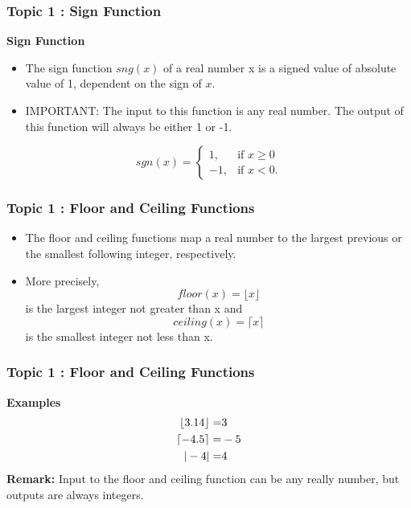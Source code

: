 \documentclass{beamer}
\begin{document}
\begin{frame}
	\frametitle{Topic 1 : Sign Function}
	\Large
	\textbf{Sign Function}
	\begin{itemize}
		\item The sign function $sng(x)$ of a real number x is a signed value of absolute value of 1, dependent on the sign of $x$. 
		
	\item IMPORTANT:  The input to this function is any real number. The output of this function will always be either 1 or -1.
	\end{itemize}
	\[ sgn(x) = \begin{cases} 1, & \mbox{if }  x \ge 0  \\ -1,  & \mbox{if } x < 0. \end{cases} \]
\end{frame}
\begin{frame}
	\frametitle{Topic 1 : Floor and Ceiling Functions}
	\Large
	\begin{itemize}
		\item The floor and ceiling functions map a real number to the largest previous or the smallest following integer, respectively. \item More precisely, \[floor(x) = \lfloor x\rfloor \] is the largest integer not greater than x and \[ceiling(x) =  \lceil x \rceil \] is the smallest integer not less than x.
	\end{itemize}
	
	
\end{frame}

\begin{frame}
	\frametitle{Topic 1 : Floor and Ceiling Functions}
	\textbf{Examples}
	{
		\LARGE
		\begin{eqnarray}
		\lfloor 3.14 \rfloor =& 3 \\ \bigskip
		\lceil -4.5 \rceil =& -5 \\ \bigskip
		| -4 | =&  4
		\end{eqnarray}
}
{\Large	
	\textbf{Remark:}  Input to the floor and ceiling function can be any really number, but outputs are always integers.
	}
\end{frame}
\end{document}
